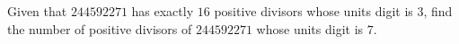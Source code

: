 Given that $244592271$ has exactly $16$ positive divisors whose units digit is $3$, find the number of positive divisors of $244592271$ whose units digit is $7$.
